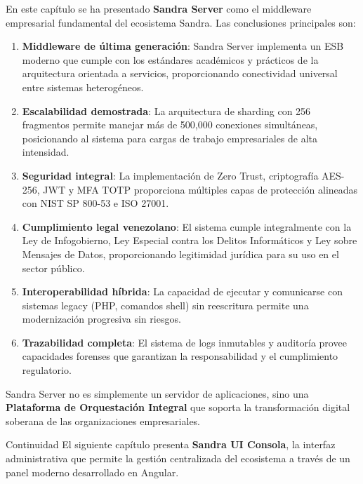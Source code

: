 En este capítulo se ha presentado \textbf{Sandra Server} como el middleware empresarial fundamental del ecosistema Sandra. Las conclusiones principales son:

\begin{enumerate}
\item \textbf{Middleware de última generación}: Sandra Server implementa un ESB moderno que cumple con los estándares académicos y prácticos de la arquitectura orientada a servicios, proporcionando conectividad universal entre sistemas heterogéneos.

\item \textbf{Escalabilidad demostrada}: La arquitectura de sharding con 256 fragmentos permite manejar más de 500,000 conexiones simultáneas, posicionando al sistema para cargas de trabajo empresariales de alta intensidad.

\item \textbf{Seguridad integral}: La implementación de Zero Trust, criptografía AES-256, JWT y MFA TOTP proporciona múltiples capas de protección alineadas con NIST SP 800-53 e ISO 27001.

\item \textbf{Cumplimiento legal venezolano}: El sistema cumple integralmente con la Ley de Infogobierno, Ley Especial contra los Delitos Informáticos y Ley sobre Mensajes de Datos, proporcionando legitimidad jurídica para su uso en el sector público.

\item \textbf{Interoperabilidad híbrida}: La capacidad de ejecutar y comunicarse con sistemas legacy (PHP, comandos shell) sin reescritura permite una modernización progresiva sin riesgos.

\item \textbf{Trazabilidad completa}: El sistema de logs inmutables y auditoría provee capacidades forenses que garantizan la responsabilidad y el cumplimiento regulatorio.
\end{enumerate}

Sandra Server no es simplemente un servidor de aplicaciones, sino una \textbf{Plataforma de Orquestación Integral} que soporta la transformación digital soberana de las organizaciones empresariales.

\bigskip

\begin{caja}{Continuidad}
El siguiente capítulo presenta \textbf{Sandra UI Consola}, la interfaz administrativa que permite la gestión centralizada del ecosistema a través de un panel moderno desarrollado en Angular.
\end{caja}

\bigskip


\bigskip

\thispagestyle{empty}

